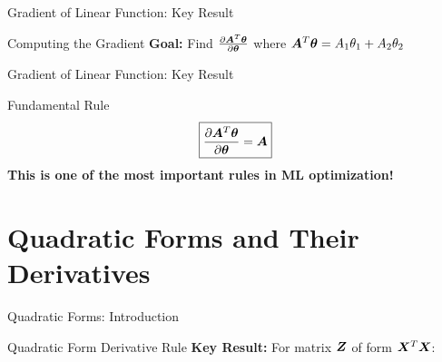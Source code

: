 \documentclass{beamer}
\begin{document}
\begin{frame}{Gradient of Linear Function: Key Result}
\begin{keypointsbox}{Computing the Gradient}
\textbf{Goal:} Find $\frac{\partial \bm{A}^T\bm{\theta}}{\partial \bm{\theta}}$ where $\bm{A}^T\bm{\theta} = A_{1}\theta_{1} + A_{2}\theta_{2}$
\end{keypointsbox}

\end{frame}

\begin{frame}{Gradient of Linear Function: Key Result}
\begin{alertbox}{Fundamental Rule}
$$\boxed{\frac{\partial \bm{A}^T\bm{\theta}}{\partial \bm{\theta}} = \bm{A}}$$
\textbf{This is one of the most important rules in ML optimization!}
\end{alertbox}
\end{frame}


\section{Quadratic Forms and Their Derivatives}

\begin{frame}{Quadratic Forms: Introduction}
\begin{definitionbox}{Quadratic Form Derivative Rule}
\textbf{Key Result:} For matrix $\bm{Z}$ of form $\bm{X}^T\bm{X}$:
\end{definitionbox}

\end{frame}
\end{document}
